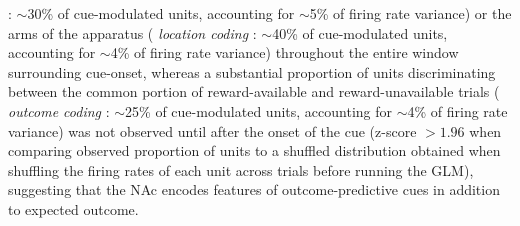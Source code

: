 \documentclass[11pt]{article}
\providecommand{\DIFadd}[1]{{\protect\color{red} \sf #1}} %
\providecommand{\DIFdel}[1]{} %
\providecommand{\DIFaddbegin}{} %
\providecommand{\DIFaddend}{} %
\providecommand{\DIFdelbegin}{} %
\providecommand{\DIFdelend}{} %
\newcommand{\DIFscaledelfig}{0.5}
\newlength{\DIFdelgraphicswidth} %
\newlength{\DIFdelgraphicsheight} %
\newcommand{\DIFaddincludegraphics}[2][]{{\color{red}\fbox{\DIFOincludegraphics[#1]{#2}}}} %
\newcommand{\DIFdelincludegraphics}[2][]{%
\sbox{\DIFdelgraphicsbox}{\DIFOincludegraphics[#1]{#2}}%
\settoboxwidth{\DIFdelgraphicswidth}{\DIFdelgraphicsbox} %
\settoboxtotalheight{\DIFdelgraphicsheight}{\DIFdelgraphicsbox} %
\scalebox{\DIFscaledelfig}{%
\parbox[b]{\DIFdelgraphicswidth}{\usebox{\DIFdelgraphicsbox}\\[-\baselineskip] \rule{\DIFdelgraphicswidth}{0em}}\llap{\resizebox{\DIFdelgraphicswidth}{\DIFdelgraphicsheight}{%
\setlength{\unitlength}{\DIFdelgraphicswidth}%
\begin{picture}(1,1)%
\thicklines\linethickness{2pt} %
{\color[rgb]{1,0,0}\put(0,0){\framebox(1,1){}}}%
{\color[rgb]{1,0,0}\put(0,0){\line( 1,1){1}}}%
{\color[rgb]{1,0,0}\put(0,1){\line(1,-1){1}}}%
\end{picture}%
}\hspace*{3pt}}} %
} %
\DeclareRobustCommand{\DIFaddbegin}{\DIFOaddbegin \let\includegraphics\DIFaddincludegraphics} %
\DeclareRobustCommand{\DIFaddend}{\DIFOaddend \let\includegraphics\DIFOincludegraphics} %
\DeclareRobustCommand{\DIFdelbegin}{\DIFOdelbegin \let\includegraphics\DIFdelincludegraphics} %
\DeclareRobustCommand{\DIFdelend}{\DIFOaddend \let\includegraphics\DIFOincludegraphics} %
\begin{document}
\DIFdel{We observed a variety of single unit response profiles around the time of cue
onset (Figure \ref{fig:examples}). To investigate whether these firing rate
patterns were related to what cue features were encoded, we plotted the population level averages for units that were modulated by each feature. To do
this, we normalized firing activity for each unit that was modulated by a given
cue feature,such as light block}\DIFdelend \DIFaddbegin \DIFadd{: $\sim$30\% of cue-modulated units, accounting for $\sim$5\% of firing rate variance) or the arms of the apparatus (}{\it \DIFadd{location coding}}\DIFadd{: $\sim$40\% of cue-modulated units, accounting for $\sim$4\% of firing rate variance) throughout the entire window surrounding cue-onset, whereas a substantial proportion of units discriminating between the common portion of reward-available and reward-unavailable trials (}{\it \DIFadd{outcome coding}}\DIFadd{: $\sim$25\% of cue-modulated units, accounting for $\sim$4\% of firing rate variance) was not observed until after the onset of the cue (z-score $>1.96$ when comparing observed proportion of units to a shuffled distribution obtained when shuffling the firing rates of each unit across trials before running the GLM)}\DIFaddend , \DIFdelbegin \DIFdel{then generated the cue-onset aligned
population average firing rate for each of the cue features (Figure
\ref{fig:pop}) . Overall, this analysis revealed that cells that showed an
increase upon cue presentation had stronger responses for the preferred cue condition (Figure \ref{fig:pop}A,C,E). Interestingly, units that were classified
as decreasing in response to the cue showed a biphasic response }\DIFdelend \DIFaddbegin \DIFadd{suggesting that the NAc encodes features of outcome-predictive cues in addition to expected outcome. 
}
\end{document}
